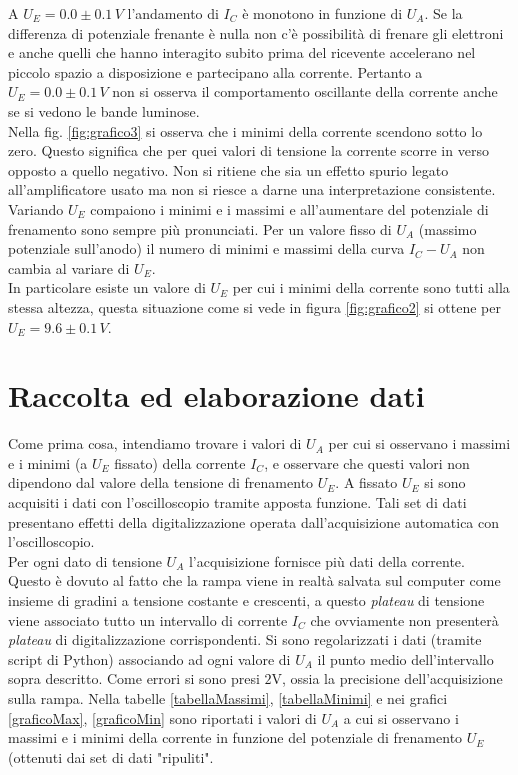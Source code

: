 \documentclass[10pt,a4paper]{article}
\begin{document}
A $U_E = 0.0 \pm0.1\, V$ l'andamento di $I_C$ è monotono in funzione di $U_A$.
Se la differenza di potenziale frenante è nulla non c'è possibilità di frenare gli elettroni e anche quelli che hanno interagito subito prima del ricevente accelerano nel piccolo spazio a disposizione e partecipano alla corrente. Pertanto a $U_E = 0.0\pm0.1\,V$ non si osserva il comportamento oscillante della corrente anche se si vedono le bande luminose.\\ 
Nella fig. \ref{fig:grafico3} si osserva che i minimi della corrente scendono sotto lo zero. Questo significa che per quei valori di tensione la corrente scorre in verso opposto a quello negativo. Non si ritiene che sia un effetto spurio legato all'amplificatore usato ma non si riesce a darne una interpretazione consistente.\\
Variando $U_E$ compaiono i minimi e i massimi e all'aumentare del potenziale di frenamento sono sempre più pronunciati. Per un valore fisso di $U_A$ (massimo potenziale sull'anodo) il numero di minimi e massimi della curva $I_C-U_A$ non cambia al variare di $U_E$.\\

In particolare esiste un valore di $U_E$ per cui i minimi della corrente sono tutti alla stessa altezza, questa situazione come si vede in figura \ref{fig:grafico2} si ottene per $U_E = 9.6 \pm0.1 \, V$.\\

\section{Raccolta ed elaborazione dati}

Come prima cosa, intendiamo trovare i valori di $U_A$ per cui si osservano i massimi e i minimi (a $U_E$ fissato) della corrente $I_C$, e osservare che questi valori non dipendono dal valore della tensione di frenamento $U_E$.
A fissato $U_E$ si sono acquisiti i dati con l'oscilloscopio tramite apposta funzione. Tali set di dati presentano effetti della digitalizzazione operata dall'acquisizione automatica con l'oscilloscopio.\\
Per ogni dato di tensione $U_A$ l'acquisizione fornisce più dati della corrente. Questo è dovuto al fatto che la rampa viene in realtà salvata sul computer come insieme di gradini a tensione costante e crescenti, a questo \emph{plateau} di tensione viene associato tutto un intervallo di corrente $I_C$ che ovviamente non presenterà \emph{plateau} di digitalizzazione corrispondenti. Si sono regolarizzati i dati (tramite script di Python) associando ad ogni valore di $U_A$ il punto medio dell'intervallo sopra descritto. Come errori si sono presi $2$V, ossia la precisione dell'acquisizione sulla rampa.
Nella tabelle \ref{tabellaMassimi}, \ref{tabellaMinimi} e nei grafici \ref{graficoMax}, \ref{graficoMin} sono riportati i valori di $U_A$ a cui si osservano i massimi e i minimi della corrente in funzione del potenziale di frenamento $U_E$ (ottenuti dai set di dati "ripuliti".\\
\end{document}
